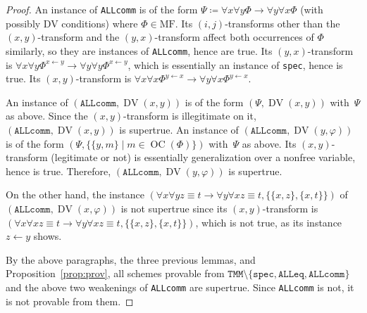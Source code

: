\documentclass[10pt,a4paper]{amsart}
\DeclareMathOperator{\DV}{DV}
\newcommand*{\MF}{\mathrm{MF}}
\DeclareMathOperator{\OC}{OC}
\renewcommand*{\phi}{\varphi}
\begin{document}
\begin{proof}
An instance of \texttt{ALLcomm} is of the form
$\Psi \coloneqq \forall x \forall y \Phi \to \forall y \forall x \Phi$ (with possibly DV conditions)
where $\Phi \in \MF$.
Its $(i, j)$-transforms other than the $(x, y)$-transform and the $(y, x)$-transform affect
both occurrences of $\Phi$ similarly, so they are instances of \texttt{ALLcomm}, hence are true.
Its $(y, x)$-transform is
$\forall x \forall y \Phi^{x \leftarrow y} \to \forall y \forall y \Phi^{x \leftarrow y}$,
which is essentially an instance of \texttt{spec}, hence is true.
Its $(x, y)$-transform is
$\forall x \forall x \Phi^{y \leftarrow x} \to \forall y \forall x \Phi^{y \leftarrow x}$.

An instance of $(\texttt{ALLcomm}, \DV(x, y))$ is of the form $(\Psi, \DV(x, y))$ with~$\Psi$
as above.
Since the $(x, y)$-transform is illegitimate on it, $(\texttt{ALLcomm}, \DV(x, y))$ is supertrue.
An instance of $(\texttt{ALLcomm}, \DV(y, \phi))$ is of the form
$(\Psi, \{ \{y, m \} \mid m \in \OC(\Phi) \})$ with~$\Psi$ as above.
Its $(x, y)$-transform (legitimate or not) is essentially generalization over a nonfree variable,
hence is true.
Therefore, $(\texttt{ALLcomm}, \DV(y, \phi))$ is supertrue.

On the other hand, the instance
$(\forall x \forall y z \equiv t \to \forall y \forall x z \equiv t, \{\{x, z\}, \{x, t\}\})$
of $(\texttt{ALLcomm}, \DV(x, \phi))$ is not supertrue since its $(x, y)$-transform is
$(\forall x \forall x z \equiv t \to \forall y \forall x z \equiv t, \{\{x, z\}, \{x, t\}\})$,
which is not true, as its instance $z \leftarrow y$ shows.

By the above paragraphs, the three previous lemmas, and Proposition~\ref{prop:prov}, all schemes
provable from $\texttt{TMM} \setminus \{\texttt{spec}, \texttt{ALLeq}, \texttt{ALLcomm} \}$ and
the above two weakenings of \texttt{ALLcomm} are supertrue.
Since \texttt{ALLcomm} is not, it is not provable from them.
\end{proof}
\end{document}
